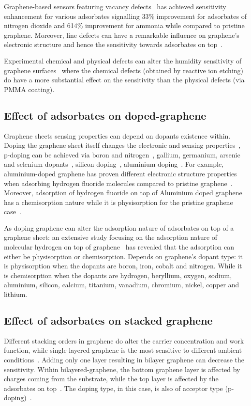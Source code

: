 Graphene-based sensors featuring vacancy defects~\cite{Lee2016} has achieved sensitivity enhancement for various adsorbates signalling 33\% improvement for adsorbates of nitrogen dioxide and 614\% improvement for ammonia while compared to pristine graphene. Moreover, line defects can have a remarkable influence on graphene's electronic structure and hence the sensitivity towards adsorbates on top~\cite{Souza2018}. 

Experimental chemical and physical defects can alter the humidity sensitivity of graphene surfaces~\cite{SON2017defect} where the chemical defects (obtained by reactive ion etching) do have a more substantial effect on the sensitivity than the physical defects (via PMMA coating). 
%
%
\subsection{Effect of adsorbates on doped-graphene}
Graphene sheets sensing properties can depend on dopants existence within. Doping the graphene sheet itself changes the electronic and sensing properties~\cite{Zhang2009dopants, Panchal2016}, p-doping can be achieved via boron and nitrogen~\cite{Yuan2010, Deng2011, Deng2012}, gallium, germanium, arsenic and selenium dopants~\cite{Chen2014, Denis2014}, silicon doping~\cite{Zou2011}, aluminium doping~\cite{Dai2009, Sharma2013}. For example, aluminium-doped graphene has proven different electronic structure properties when adsorbing hydrogen fluoride molecules compared to pristine graphene~\cite{Sun2010}. Moreover, adsorption of hydrogen fluoride on top of Aluminium doped graphene has a chemisorption nature while it is physisorption for the pristine graphene case~\cite{Sun2010}. 

As doping graphene can alter the adsorption nature of adsorbates on top of a graphene sheet: an extensive study focusing on the adsorption nature of molecular hydrogen on top of graphene~\cite{Gallouze2013} has revealed that the adsorption can either be physisorption or chemisorption. Depends on graphene's dopant type: it is physisorption when the dopants are boron, iron, cobalt and nitrogen. While it is chemisorption when the dopants are hydrogen, beryllium, oxygen, sodium, aluminium, silicon, calcium, titanium, vanadium, chromium, nickel, copper and lithium.
%
%
%
%
\subsection{Effect of adsorbates on stacked graphene}
Different stacking orders in graphene do alter the carrier concentration and work function, while single-layered graphene is the most sensitive to different ambient conditions~\cite{Giusca2015, Panchal2016}. Adding only one layer resulting in bilayer graphene can decrease the sensitivity. Within bilayered-graphene, the bottom graphene layer is affected by charges coming from the substrate, while the top layer is affected by the adsorbates on top~\cite{Xuge2017}. The doping type, in this case, is also of acceptor type (p-doping)~\cite{Melios2016}.
%
%
%
%
